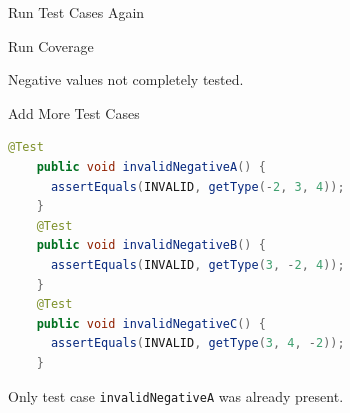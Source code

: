 \begin{Frame}{Run Test Cases Again}
\begin{center}
{    }%
  \end{center}
\end{Frame}

\begin{Frame}{Run Coverage}
  \begin{center}
  \end{center}

  \xxx

  Negative values not completely tested.
\end{Frame}

\begin{Frame}[fragile]{Add More Test Cases}
  \begin{lstlisting}[language=java,gobble=4,basicstyle=\ttfamily\footnotesize]
    @Test
    public void invalidNegativeA() {
      assertEquals(INVALID, getType(-2, 3, 4));
    }
    @Test
    public void invalidNegativeB() {
      assertEquals(INVALID, getType(3, -2, 4));
    }
    @Test
    public void invalidNegativeC() {
      assertEquals(INVALID, getType(3, 4, -2));
    }
  \end{lstlisting}

  \xxx

  Only test case \lstinline[language=java]-invalidNegativeA- was already present.
\end{Frame}

